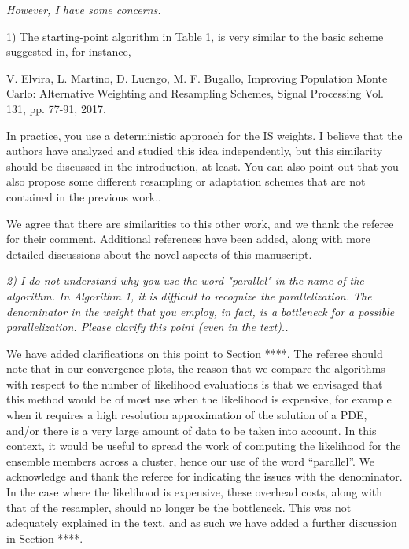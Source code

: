 \documentclass{article}
\newcommand{\comment}[2]{\vspace{0.6cm}{\bf Comment:} {\it #1.}

\vspace{0.3cm}{\bf Answer:} #2}
\begin{document}
\comment{However, I have some concerns. 

1) The starting-point algorithm in Table 1, is very similar to the basic scheme suggested in, for instance, 

V. Elvira, L. Martino, D. Luengo, M. F. Bugallo, Improving Population Monte Carlo: Alternative Weighting and Resampling Schemes, Signal Processing Vol. 131, pp. 77-91, 2017. 

In practice, you use a deterministic approach for the IS weights. 
I believe that the authors have analyzed and studied this idea independently, but this similarity should be discussed in the introduction, at least. 
You can also point out that you also propose some different resampling or adaptation schemes that are not contained in the previous work.}{We agree that there are similarities to this other work, and we thank the referee for their comment. Additional references have been added, along with more detailed discussions about the novel aspects of this manuscript.}

\comment{2) I do not understand why you use the word "parallel" in the name of the algorithm. In Algorithm 1, it is difficult to recognize the parallelization. The denominator in the weight that you employ, in fact, is a bottleneck for a possible parallelization. Please clarify this point (even in the text).}{We have added clarifications on this point to Section ****. The referee should note that in our convergence plots, the reason that we compare the algorithms with respect to the number of likelihood evaluations is that we envisaged that this method would be of most use when the likelihood is expensive, for example when it requires a high resolution approximation of the solution of a PDE, and/or there is a very large amount of data to be taken into account. In this context, it would be useful to spread the work of computing the likelihood for the ensemble members across a cluster, hence our use of the word ``parallel''. We acknowledge and thank the referee for indicating the issues with the denominator. In the case where the likelihood is expensive, these overhead costs, along with that of the resampler, should no longer be the bottleneck. This was not adequately explained in the text, and as such we have added a further discussion in Section ****.

}
\end{document}
